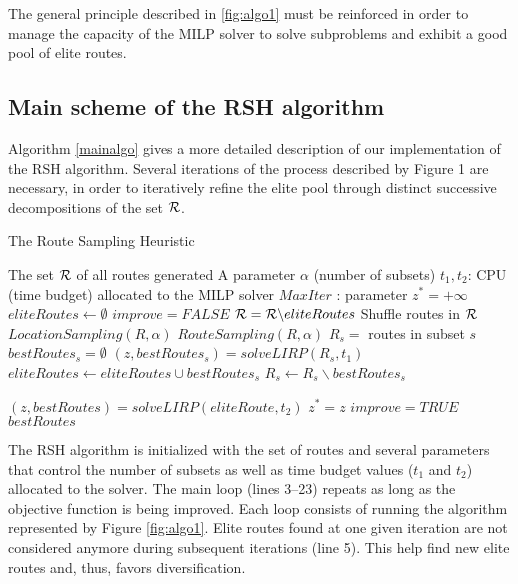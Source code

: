 \documentclass[a4paper,10pt]{article}
\begin{document}
\begin{linenumbers}
The general principle described in \ref{fig:algo1} must be reinforced in order to manage the capacity of the MILP solver to solve subproblems and exhibit a good pool of elite routes. 


\subsection{Main scheme of the RSH algorithm} \label{sec:RSH}


Algorithm \ref{mainalgo} gives a more detailed description of our implementation of the RSH algorithm. 
Several iterations of the process described by Figure 1 are necessary, in order to iteratively refine the elite pool through distinct successive decompositions of the set $\mathcal{R}$. 
 

\begin{algorithm}
	\caption{The Route Sampling Heuristic}
	\label{mainalgo}
	\begin{algorithmic}[1]
		\REQUIRE  The set $\mathcal{R}$ of all routes generated
		\REQUIRE A parameter $\alpha$ (number of subsets)
		\REQUIRE $t_1, t_2$: CPU (time budget) allocated to the MILP solver
		\REQUIRE $MaxIter$ : parameter
		\STATE $z^*= +\infty$
		\STATE $eliteRoutes \leftarrow \emptyset$
		\REPEAT
		\STATE $improve = FALSE$
		\STATE $\mathcal{R} =  \mathcal{R} \backslash eliteRoutes$
		\STATE Shuffle routes in $\mathcal{R}$
		\STATE $LocationSampling(R,\alpha)$ 
		\STATE $RouteSampling(R,\alpha)$	
		\STATE $R_s = $ routes in subset $s$
		\STATE $bestRoutes_s = \emptyset$
		\STATE $(z,bestRoutes_s) = solveLIRP(R_s,t_1)$ 
		\STATE $eliteRoutes \leftarrow eliteRoutes \cup bestRoutes_s$
		\STATE $R_s \leftarrow R_s \backslash bestRoutes_s$
		
		\ENDFOR
		\ENDFOR
		\STATE 	$(z,bestRoutes) = solveLIRP(eliteRoute, t_2)$
		\STATE $z^*=z$
		\STATE $improve =TRUE$
		\ENDIF
		\RETURN $bestRoutes$
	\end{algorithmic}
\end{algorithm}


The RSH algorithm is initialized with the set of routes and several parameters that control the number of subsets as well as time budget values ($t_1$ and $t_2$) allocated to the solver. 
The main loop (lines 3--23) repeats as long as the objective function is being improved. 
Each loop consists of running the algorithm represented by Figure \ref{fig:algo1}. 
Elite routes found at one given iteration are not considered anymore during subsequent iterations (line 5). This help find new elite routes and, thus, favors diversification. 



\end{linenumbers}
\end{document}
